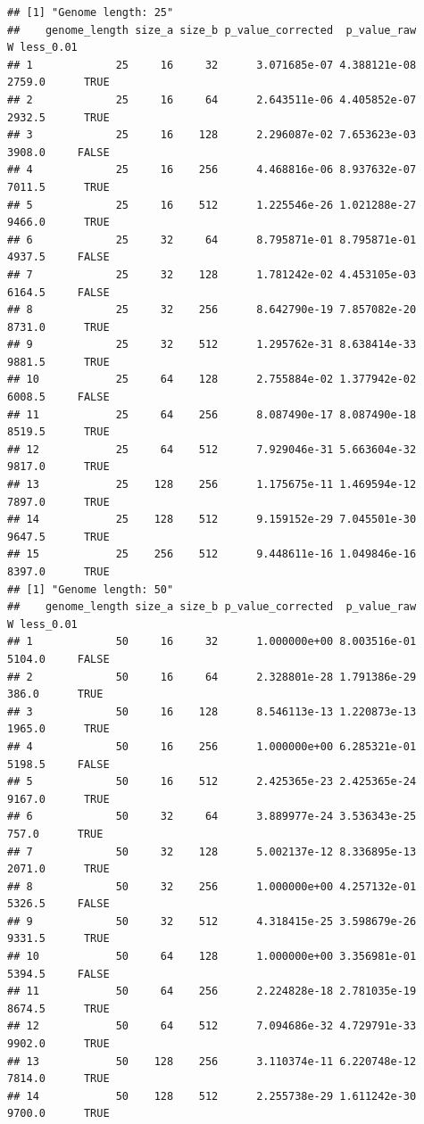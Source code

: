 \documentclass[
]{book}
\begin{document}
\begin{verbatim}
## [1] "Genome length: 25"
##    genome_length size_a size_b p_value_corrected  p_value_raw      W less_0.01
## 1             25     16     32      3.071685e-07 4.388121e-08 2759.0      TRUE
## 2             25     16     64      2.643511e-06 4.405852e-07 2932.5      TRUE
## 3             25     16    128      2.296087e-02 7.653623e-03 3908.0     FALSE
## 4             25     16    256      4.468816e-06 8.937632e-07 7011.5      TRUE
## 5             25     16    512      1.225546e-26 1.021288e-27 9466.0      TRUE
## 6             25     32     64      8.795871e-01 8.795871e-01 4937.5     FALSE
## 7             25     32    128      1.781242e-02 4.453105e-03 6164.5     FALSE
## 8             25     32    256      8.642790e-19 7.857082e-20 8731.0      TRUE
## 9             25     32    512      1.295762e-31 8.638414e-33 9881.5      TRUE
## 10            25     64    128      2.755884e-02 1.377942e-02 6008.5     FALSE
## 11            25     64    256      8.087490e-17 8.087490e-18 8519.5      TRUE
## 12            25     64    512      7.929046e-31 5.663604e-32 9817.0      TRUE
## 13            25    128    256      1.175675e-11 1.469594e-12 7897.0      TRUE
## 14            25    128    512      9.159152e-29 7.045501e-30 9647.5      TRUE
## 15            25    256    512      9.448611e-16 1.049846e-16 8397.0      TRUE
## [1] "Genome length: 50"
##    genome_length size_a size_b p_value_corrected  p_value_raw      W less_0.01
## 1             50     16     32      1.000000e+00 8.003516e-01 5104.0     FALSE
## 2             50     16     64      2.328801e-28 1.791386e-29  386.0      TRUE
## 3             50     16    128      8.546113e-13 1.220873e-13 1965.0      TRUE
## 4             50     16    256      1.000000e+00 6.285321e-01 5198.5     FALSE
## 5             50     16    512      2.425365e-23 2.425365e-24 9167.0      TRUE
## 6             50     32     64      3.889977e-24 3.536343e-25  757.0      TRUE
## 7             50     32    128      5.002137e-12 8.336895e-13 2071.0      TRUE
## 8             50     32    256      1.000000e+00 4.257132e-01 5326.5     FALSE
## 9             50     32    512      4.318415e-25 3.598679e-26 9331.5      TRUE
## 10            50     64    128      1.000000e+00 3.356981e-01 5394.5     FALSE
## 11            50     64    256      2.224828e-18 2.781035e-19 8674.5      TRUE
## 12            50     64    512      7.094686e-32 4.729791e-33 9902.0      TRUE
## 13            50    128    256      3.110374e-11 6.220748e-12 7814.0      TRUE
## 14            50    128    512      2.255738e-29 1.611242e-30 9700.0      TRUE

\end{verbatim}
\end{document}
